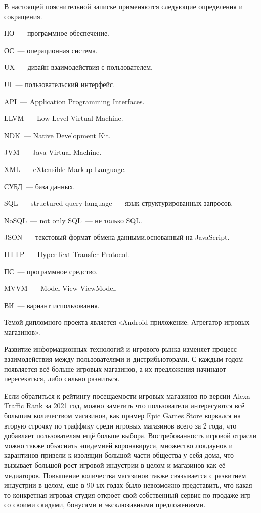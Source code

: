 \setcounter{page}{6}
\setlength{\parindent}{0ex}
В настоящей пояснительной записке применяются следующие определения и сокращения.

ПО~--- программное обеспечение.

ОС~--- операционная система.

UX~--- дизайн взаимодействия с пользователем.

UI~--- пользовательский интерфейс.

API~--- Application Programming Interfaces.

LLVM~--- Low Level Virtual Machine.

NDK~--- Native Development Kit.

JVM~--- Java Virtual Machine.

XML~--- eXtensible Markup Language.

СУБД~--- база данных.

SQL~--- structured query language~--- язык структурированных запросов.

NoSQL~--- not only SQL~--- не только SQL.

JSON~--- текстовый формат обмена данными,основанный на JavaScript.

HTTP~--- HyperText Transfer Protocol.

ПС~--- программное средство.

MVVM~--- Model View ViewModel.

ВИ~--- вариант использования.
\setlength{\parindent}{\fivecharsapprox}
\newpage


\label{sec:intro}

Темой дипломного проекта является «Android-приложение: Агрегатор игровых магазинов».

Развитие информационных технологий и игрового рынка изменяет процесс взаимодействия между пользователями и дистрибьюторами. С каждым годом появляется всё больше игровых магазинов, а их предложения начинают пересекаться, либо сильно разниться. 

Если обратиться к рейтингу посещаемости игровых магазинов по версии Alexa Traffic Rank \cite{web0} за 2021 год, можно заметить что пользователи интересуются всё большим количеством магазинов, как пример Epic Games Store ворвался на вторую строчку по траффику среди игровых магазинов всего за 2 года, что добавляет пользователям ещё больше выбора.
Востребованность игровой отрасли можно также объяснить эпидемией коронавируса, множество локдаунов и карантинов привели к изоляции большой части общества у себя дома, что вызывает большой рост игровой индустрии в целом и магазинов как её медиаторов.
Повышение количества магазинов также связывается с развитием индустрии в целом, еще в 90-ых годах было невозможно представить, что какая-то конкретная игровая студия откроет свой собственный сервис по продаже игр со своими скидами, бонусами и эксклюзивными предложениями.

